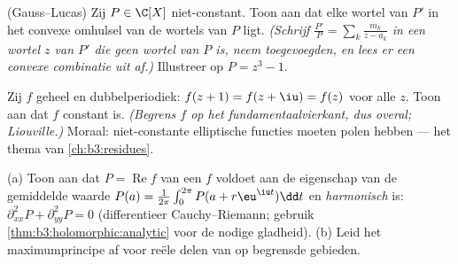 \begin{exercise}[$\star\star\star$]\label{exo:b3:holomorphic:8}
(Gauss--Lucas) Zij $P \in \C[X]$ niet-constant. Toon aan dat elke
wortel van $P'$ in het convexe omhulsel van de wortels van $P$
ligt. \emph{(Schrijf $\frac{P'}{P} = \sum_k\frac{m_k}{z - a_k}$
in een wortel $z$ van $P'$ die geen wortel van $P$ is, neem
toegevoegden, en lees er een convexe combinatie uit af.)}
Illustreer op $P = z^3 - 1$.
\end{exercise}

\begin{exercise}[$\star\star\star$]\label{exo:b3:holomorphic:9}
Zij $f$ geheel en dubbelperiodiek: $f(z + 1) = f(z + \iu) = f(z)$
voor alle $z$. Toon aan dat $f$ constant is. \emph{(Begrens $f$
op het  fundamentaalvierkant, dus overal; Liouville.)}
Moraal: niet-constante elliptische functies moeten polen hebben
--- het thema van \cref{ch:b3:residues}.
\end{exercise}

\begin{exercise}[$\star\star$]\label{exo:b3:holomorphic:10}
(a) Toon aan dat $P = \operatorname{Re}f$ van een  $f$
voldoet aan de eigenschap van de gemiddelde waarde $P(a) =
\frac1{2\pi}\int_0^{2\pi}P(a + r\eu^{\iu t})\dd t$ en
\emph{harmonisch} is: $\partial^2_{xx}P + \partial^2_{yy}P = 0$
(differentieer Cauchy--Riemann; gebruik
\cref{thm:b3:holomorphic:analytic} voor de nodige gladheid).
(b) Leid het maximumprincipe af voor reële delen van  op begrensde gebieden.
\end{exercise}

